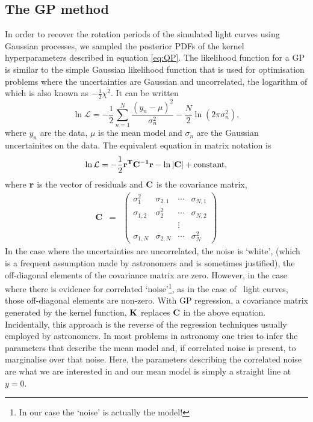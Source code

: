 \subsection{The GP method}

In order to recover the rotation periods of the simulated light curves using
Gaussian processes, we sampled the posterior PDFs of the kernel
hyperparameters described in equation \ref{eq:QP}.
The likelihood function for a GP is similar to the simple Gaussian likelihood
function that is used for optimisation problems where the uncertainties are
Gaussian and uncorrelated, the logarithm of which is also known as
$-\frac{1}{2}\chi^2$.
It can be written
\begin{equation}
\ln \mathcal{L} = -\frac{1}{2}\sum_{n=1}^N\frac{(y_n-\mu)^2}{\sigma_n^2}
    - \frac{N}{2}\ln(2\pi\sigma_n^2),
\end{equation}
\label{eq:chi2}
where $y_n$ are the data, $\mu$ is the mean model and $\sigma_n$ are the
Gaussian uncertainites on the data.
The equivalent equation in matrix notation is
\begin{equation}
\ln \mathcal{L} = -\frac{1}{2}\bf{r}^T\bf{C}^{-1}\bf{r}-\ln|\bf{C}|
    + \mathrm{constant},
\end{equation}
\label{eq:lhf1}
where $\bf{r}$ is the vector of residuals and $\bf{C}$ is the covariance
matrix,
\begin{eqnarray}
	\mathbf{C} &=& \left (\begin{array}{cccc}
	\sigma^2_1 & \sigma_{2, 1} & \cdots & \sigma_{N, 1} \\
	\sigma_{1, 2} & \sigma^2_2 & \cdots & \sigma_{N, 2} \\
    && \vdots & \\
	\sigma_{1, N} & \sigma_{2, N} & \cdots & \sigma^2_N
\end{array}\right )
\end{eqnarray}
In the case where the uncertainties are uncorrelated, the noise is `white',
(which is a frequent assumption made by astronomers and is sometimes
justified), the off-diagonal elements of the covariance matrix are zero.
However, in the case where there is evidence for correlated
`noise'\footnote{In our case the `noise' is actually the model!}, as in the
case of \Kepler\ light curves, those off-diagonal elements are non-zero.
With GP regression, a covariance matrix generated by the kernel function,
${\bf K}$ replaces ${\bf C}$ in the above equation.
Incidentally, this approach is the reverse of the regression techniques
usually employed by astronomers.
In most problems in astronomy one tries to infer the parameters that describe
the mean model and, if correlated noise is present, to marginalise over that
noise.
Here, the parameters describing the correlated noise are what we are
interested in and our mean model is simply a straight line at $y=0$.

